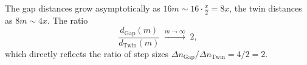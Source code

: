 \begin{remark}
The gap distances grow asymptotically as $16m \sim 16\cdot\frac{x}{2} = 8x$,
the twin distances as $8m \sim 4x$. The ratio
\[
  \frac{d_{\mathrm{Gap}}(m)}{d_{\mathrm{Twin}}(m)}
  \;\xrightarrow{m\to\infty}\; 2,
\]
which directly reflects the ratio of step sizes $\Delta n_{\mathrm{Gap}} /
\Delta n_{\mathrm{Twin}} = 4/2 = 2$.
\end{remark}
